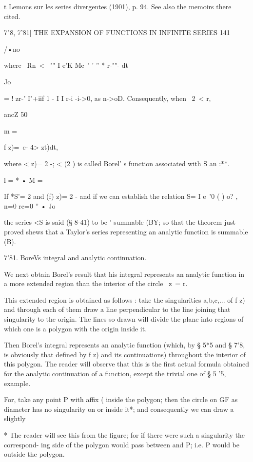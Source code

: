 {t Lemons sur les series divergentes (1901), p. 94. See also the
memoirs there cited.

7"8, 7'81] THE EXPANSION OF FUNCTIONS IN INFINITE SERIES 141

/•no

where \ Rn\ < \ "" I e'K Me\ ' ' '' * r-""- dt

Jo

= ! zr-' I"+iif 1 - I I r-i -i->0, as n->oD. Consequently, when \ 2\ <
r,

ancZ 50

m =

f z)=\ e- 4> zt)dt,

where < z)= 2 -; < (2 ) is called Borel' s function associated with S
an :**.

 l = * • M =

If *S'= 2 and (f) z)= 2 - and if we can establish the relation S= I
e~'0 ( ) o? , n=0 re=0 '' • Jo

the series <S is said (§ 8-41) to be ' summable (BY; so that the
theorem just proved shews that a Taylor's series representing an
analytic function is summable (B).

7'81. BoreVs integral and analytic continuation.

We next obtain Borel's result that his integral represents an analytic
function in a more extended region than the interior of the circle \
z\ = r.

This extended region is obtained as follows : take the singularities
a,b,c,... of f z) and through each of them draw a line perpendicular
to the line joining that singularity to the origin. The lines so drawn
will divide the plane into regions of which one is a polygon with the
origin inside it.

Then Borel's integral represents an analytic function (which, by § 5*5
and § 7'8, is obviously that defined by f z) and its continuations)
throughout the interior of this polygon. The reader will observe that
this is the first actual formula obtained for the analytic
continuation of a function, except the trivial one of § 5 '5, example.

For, take any point P with affix ( inside the polygon; then the circle
on GF as diameter has no singularity on or inside it*; and
consequently we can draw a slightly

* The reader will see this from the figure; for if there were such a
singularity the correspond- ing side of the polygon would pass between
and P; i.e. P would be outside the polygon.

}
